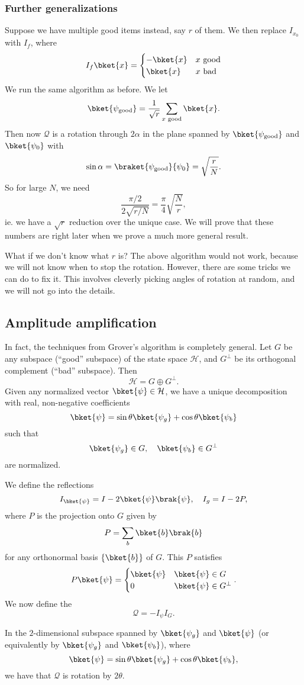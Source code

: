 \documentclass[a4paper]{article}
\begin{document}
\subsubsection*{Further generalizations}
Suppose we have multiple good items instead, say $r$ of them. We then replace $I_{x_0}$ with $I_f$, where
\[
  I_f \bket{x} =
  \begin{cases}
    -\bket{x} & x\text{ good}\\
    \bket{x} & x\text{ bad}
  \end{cases}
\]
We run the same algorithm as before. We let
\[
  \bket{\psi_{\mathrm{good}}} = \frac{1}{\sqrt{r}} \sum_{x\text{ good}} \bket{x}.
\]
Then now $\mathcal{Q}$ is a rotation through $2\alpha$ in the plane spanned by $\bket{\psi_{\mathrm{good}}}$ and $\bket{\psi_0}$ with
\[
  \sin \alpha = \braket{\psi_{\mathrm{good}}}{\psi_0} = \sqrt{\frac{r}{N}}.
\]
So for large $N$, we need
\[
  \frac{\pi/2}{2\sqrt{r/N}} = \frac{\pi}{4} \sqrt{\frac{N}{r}},
\]
ie. we have a $\sqrt{r}$ reduction over the unique case. We will prove that these numbers are right later when we prove a much more general result.

What if we don't know what $r$ is? The above algorithm would not work, because we will not know when to stop the rotation. However, there are some tricks we can do to fix it. This involves cleverly picking angles of rotation at random, and we will not go into the details.

\subsection{Amplitude amplification}
In fact, the techniques from Grover's algorithm is completely general. Let $G$ be any subspace (``good'' subspace) of the state space $\mathcal{H}$, and $G^\perp$ be its orthogonal complement (``bad'' subspace). Then
\[
  \mathcal{H} = G \oplus G^\perp.
\]
Given any normalized vector $\bket{\psi} \in \mathcal{H}$, we have a unique decomposition with real, non-negative coefficients
\[
  \bket{\psi} = \sin \theta \bket{\psi_g} + \cos \theta \bket{\psi_b}
\]
such that
\[
  \bket{\psi_g} \in G,\quad \bket{\psi_b} \in G^\perp
\]
are normalized.

We define the reflections
\[
  I_{\bket{\psi}} = I -2\bket{\psi}\brak{\psi}, \quad I_g = I - 2P,
\]
where $P$ is the projection onto $G$ given by
\[
  P = \sum_b \bket{b}\brak{b}
\]
for any orthonormal basis $\{\bket{b}\}$ of $G$. This $P$ satisfies
\[
  P \bket{\psi} =
  \begin{cases}
    \bket{\psi} & \bket{\psi} \in G\\
    0 & \bket{\psi} \in G^\perp
  \end{cases}.
\]
We now define the 
\[
  \mathcal{Q} = - I_\psi I_G.
\]
\begin{thm}
  In the $2$-dimensional subspace spanned by $\bket{\psi_g}$ and $\bket{\psi}$ (or equivalently by $\bket{\psi_g}$ and $\bket{\psi_b}$), where
  \[
    \bket{\psi} = \sin \theta \bket{\psi_g} + \cos \theta \bket{\psi_b},
  \]
  we have that $\mathcal{Q}$ is rotation by $2 \theta$.
\end{thm}
\end{document}
